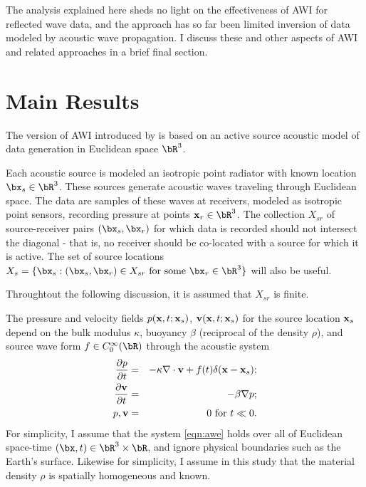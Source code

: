 The analysis explained here sheds no light on the effectiveness of AWI
for reflected wave data, and the approach has so far been limited
inversion of data modeled by acoustic wave propagation. I discuss
these and other aspects of AWI and related approaches in a brief final
section.

\section{Main Results}

The version of AWI introduced by \cite{Warner:16} is based on an
active source acoustic model of data generation in Euclidean space
$\bR^3$. 

Each acoustic source is modeled an isotropic point radiator
with known location $\bx_s\in \bR^3$. These
sources generate acoustic waves traveling through Euclidean space. The
data are samples of these waves at receivers, modeled as isotropic
point sensors, recording pressure at points
${\bf x}_r \in \bR^3$. The collection $X_{sr}$ of source-receiver pairs
$(\bx_s,\bx_r)$ for which data is recorded should not intersect the
diagonal - that is, no receiver should be co-located with a source for
which it is active. The set of source locations $X_s = \{\bx_s: (\bx_s,\bx_r) \in X_{sr}
\mbox{ for some } \bx_r \in \bR^3\}$ will also be useful.

Throughtout the following discussion, it is assumed that
$X_{sr}$ is finite. 
  
The pressure and velocity fields $p({\bf x},t;{\bf x}_s)$,
${\bf v}({\bf x},t;{\bf x}_s)$ for the source location ${\bf x}_s$
depend on the bulk modulus $\kappa$, buoyancy $\beta$
(reciprocal of the density $\rho$), and source wave
form $f \in C_0^{\infty}(\bR)$ through the acoustic system
\begin{eqnarray}
  \label{eqn:awe}
 \frac{\partial p}{\partial t} & = &- \kappa \nabla \cdot {\bf v} +
                                    f(t) \delta({\bf x}-{\bf x}_s); \nonumber \\
\frac{\partial {\bf v}}{\partial t} & = & - \beta \nabla p; \\ 
p, {\bf v} & = & 0 \mbox{ for }  t \ll 0.
\end{eqnarray}
For simplicity, I assume that the system \ref{eqn:awe} holds over all of Euclidean
space-time $(\bx,t) \in \bR^3 \times \bR$, and ignore physical
boundaries such as the Earth's surface. Likewise for simplicity, I
assume in this study that the material density $\rho$ is spatially
homogeneous and known.

